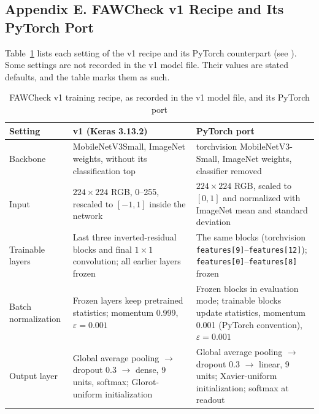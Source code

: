\documentclass{icsthesis}
\newcommand{\secref}[1]{\textit{\nameref{#1}}}
\begin{document}
\begin{mainmatter}
			\subsection{Appendix E. FAWCheck v1 Recipe and Its PyTorch Port}\label{app:recipe}

				\setcounter{table}{0}

				Table~\ref{tab:recipe} lists each setting of the v1 recipe and its
				PyTorch counterpart (see \secref{sec:recipe}). Some settings are not
				recorded in the v1 model file. Their values are stated defaults, and
				the table marks them as such.

				\begin{table}[htbp]
				\vspace{4ex}
				\centering
					\caption{FAWCheck v1 training recipe, as recorded in the v1 model file, and
					its PyTorch port}
					\label{tab:recipe}
					\singlespacing\footnotesize
					\begin{tabular}{p{2.6cm}p{5.6cm}p{5.6cm}}
					\hline
					\hline
					Setting & v1 (Keras 3.13.2) & PyTorch port \\ \hline
					Backbone & MobileNetV3Small, ImageNet weights, without its classification
					top & torchvision MobileNetV3-Small, ImageNet weights, classifier removed
					\\ \hline
					Input & $224 \times 224$ RGB, 0--255, rescaled to $[-1, 1]$ inside the
					network & $224 \times 224$ RGB, scaled to $[0, 1]$ and normalized with
					ImageNet mean and standard deviation \\ \hline
					Trainable layers & Last three inverted-residual blocks and final $1 \times
					1$ convolution; all earlier layers frozen & The same blocks (torchvision
					\texttt{features[9]}--\texttt{features[12]});
					\texttt{features[0]}--\texttt{features[8]} frozen \\ \hline
					Batch normalization & Frozen layers keep pretrained statistics; momentum
					0.999, $\varepsilon = 0.001$ & Frozen blocks in evaluation mode; trainable
					blocks update statistics, momentum 0.001 (PyTorch convention), $\varepsilon
					= 0.001$ \\ \hline
					Output layer & Global average pooling $\rightarrow$ dropout 0.3
					$\rightarrow$ dense, 9 units, softmax; Glorot-uniform initialization &
					Global average pooling $\rightarrow$ dropout 0.3 $\rightarrow$ linear, 9
					units; Xavier-uniform initialization; softmax at readout \\ \hline

\end{tabular}
\end{table}
\end{mainmatter}
\end{document}
